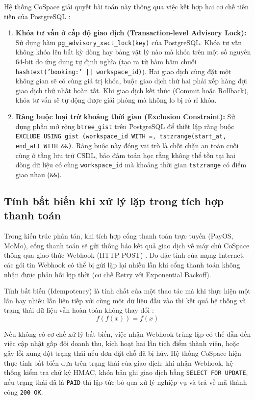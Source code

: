 Hệ thống CoSpace giải quyết bài toán này thông qua việc kết hợp hai cơ chế tiên tiến của PostgreSQL \cite{postgresql_documentation}:
\begin{enumerate}
    \item \textbf{Khóa tư vấn ở cấp độ giao dịch (Transaction-level Advisory Lock):} Sử dụng hàm \texttt{pg\_advisory\_xact\_lock(key)} của PostgreSQL. Khóa tư vấn không khóa lên bất kỳ dòng hay bảng vật lý nào mà khóa trên một số nguyên 64-bit do ứng dụng tự định nghĩa (tạo ra từ hàm băm chuỗi \texttt{hashtext('booking:' || workspace\_id)}). Hai giao dịch cùng đặt một không gian sẽ có cùng giá trị khóa, buộc giao dịch thứ hai phải xếp hàng đợi giao dịch thứ nhất hoàn tất. Khi giao dịch kết thúc (Commit hoặc Rollback), khóa tư vấn sẽ tự động được giải phóng mà không lo bị rò rỉ khóa.
    \item \textbf{Ràng buộc loại trừ khoảng thời gian (Exclusion Constraint):} Sử dụng phần mở rộng \texttt{btree\_gist} trên PostgreSQL để thiết lập ràng buộc \texttt{EXCLUDE USING gist (workspace\_id WITH =, tstzrange(start\_at, end\_at) WITH \&\&)}. Ràng buộc này đóng vai trò là chốt chặn an toàn cuối cùng ở tầng lưu trữ CSDL, bảo đảm toán học rằng không thể tồn tại hai dòng dữ liệu có cùng \texttt{workspace\_id} mà khoảng thời gian \texttt{tstzrange} có điểm giao nhau (\texttt{\&\&}).
\end{enumerate}

\subsection{Tính bất biến khi xử lý lặp trong tích hợp thanh toán}
Trong kiến trúc phân tán, khi tích hợp cổng thanh toán trực tuyến (PayOS, MoMo), cổng thanh toán sẽ gửi thông báo kết quả giao dịch về máy chủ CoSpace thông qua giao thức Webhook (HTTP POST) \cite{payos_docs}. Do đặc tính của mạng Internet, các gói tin Webhook có thể bị gửi lặp lại nhiều lần khi cổng thanh toán không nhận được phản hồi kịp thời (cơ chế Retry với Exponential Backoff).

Tính bất biến (Idempotency) là tính chất của một thao tác mà khi thực hiện một lần hay nhiều lần liên tiếp với cùng một dữ liệu đầu vào thì kết quả hệ thống và trạng thái dữ liệu vẫn hoàn toàn không thay đổi \cite{fowler2002poeaa}:
\begin{equation}
    f(f(x)) = f(x)
    \label{eq:idempotency}
\end{equation}

Nếu không có cơ chế xử lý bất biến, việc nhận Webhook trùng lặp có thể dẫn đến việc cập nhật gấp đôi doanh thu, kích hoạt hai lần tích điểm thành viên, hoặc gây lỗi xung đột trạng thái nếu đơn đặt chỗ đã bị hủy. Hệ thống CoSpace hiện thực tính bất biến dựa trên trạng thái của giao dịch: khi nhận Webhook, hệ thống kiểm tra chữ ký HMAC, khóa bản ghi giao dịch bằng \texttt{SELECT FOR UPDATE}, nếu trạng thái đã là \texttt{PAID} thì lập tức bỏ qua xử lý nghiệp vụ và trả về mã thành công \texttt{200 OK}.


